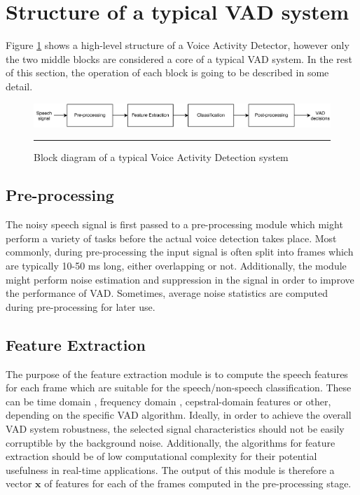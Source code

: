 \section{Structure of a typical VAD system}

Figure \ref{fig:VADStructure} shows a high-level structure of a Voice Activity Detector, however only the two middle blocks are considered a core of a typical VAD system. In the rest of this section, the operation of each block is going to be described in some detail. \bigskip

\begin{figure}[htbp]
	\centering
		\includegraphics[width=1.0\columnwidth]{Figures/Chapter1/VADStructure.png}
		\rule{37em}{0.5pt}
	\caption[Block diagram of a typical Voice Activity Detection system]{Block diagram of a typical Voice Activity Detection system}
	\label{fig:VADStructure}
\end{figure}

\subsection{Pre-processing}

The noisy speech signal is first passed to a pre-processing module which might perform a variety of tasks before the actual voice detection takes place. Most commonly, during pre-processing the input signal is often split into frames which are typically 10-50 ms long, either overlapping or not. Additionally, the module might perform noise estimation and suppression in the signal in order to improve the performance of VAD. Sometimes, average noise statistics are computed during pre-processing for later use.

\subsection{Feature Extraction}

The purpose of the feature extraction module is to compute the speech features for each frame which are suitable for the speech/non-speech classification. These can be time domain \cite{Kida, Weaver}, frequency domain \cite{Tuske, LTSD, Tan, PARADE, RamirezMulti, Sohn, SohnInitial, Renevey}, cepstral-domain \cite{Kotcher} features or other, depending on the specific VAD algorithm. Ideally, in order to achieve the overall VAD system robustness, the selected signal characteristics should not be easily corruptible by the background noise. Additionally, the algorithms for feature extraction should be of low computational complexity for their potential usefulness in real-time applications. The output of this module is therefore a vector $\mathbf{x}$ of features for each of the frames computed in the pre-processing stage.

